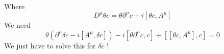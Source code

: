 \documentclass[a4paper]{book}
\theoremstyle{definition}
\theoremstyle{remark}
\begin{document}
Where 
\begin{equation}
    D^\mu \theta c = \theta \partial^\mu c + i[\theta c, A^\mu]
\end{equation}
We need 
\begin{equation}
    \theta (\partial^\mu \delta c - i[A^\mu, \delta c ]) -i[\theta \partial^\mu c, c] + [[\theta c, A^\mu], c] = 0
\end{equation}
We just have to solve this for $\delta c$ ! 
\end{document}
